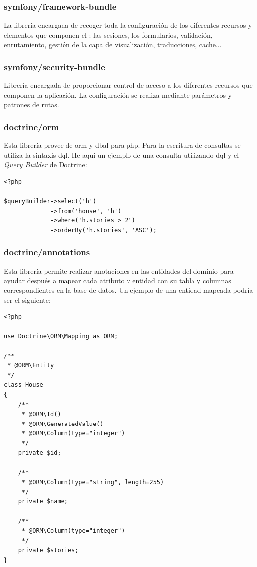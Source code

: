 \subsubsection{symfony/framework-bundle}
La librería encargada de recoger toda la configuración de los diferentes
recursos y elementos que componen el : las
sesiones, los formularios, validación, enrutamiento\cite{symfony_frambun},
gestión de la capa de visualización, traducciones, cache...

\subsubsection{symfony/security-bundle}
Librería encargada de proporcionar control de acceso a los diferentes recursos
que componen la aplicación. La configuración se realiza mediante parámetros y
patrones de rutas.

\subsubsection{doctrine/orm}
Esta librería provee de \gls{orm} y \gls{dbal} para \gls{php}. Para la
escritura de consultas se utiliza la sintaxis \gls{dql}. He aquí un ejemplo
de una consulta utilizando \gls{dql} y el \textit{Query Builder} de Doctrine:

\begin{verbatim}
<?php

$queryBuilder->select('h')
             ->from('house', 'h')
             ->where('h.stories > 2')
             ->orderBy('h.stories', 'ASC');

\end{verbatim}

\subsubsection{doctrine/annotations}
Esta librería permite realizar anotaciones en las entidades del dominio para
ayudar después a mapear cada atributo y entidad con su tabla y columnas
correspondientes en la base de datos. Un ejemplo de una entidad mapeada podría
ser el siguiente:

\begin{verbatim}
<?php

use Doctrine\ORM\Mapping as ORM;

/**
 * @ORM\Entity
 */
class House
{
    /**
     * @ORM\Id()
     * @ORM\GeneratedValue()
     * @ORM\Column(type="integer")
     */
    private $id;

    /**
     * @ORM\Column(type="string", length=255)
     */
    private $name;

    /**
     * @ORM\Column(type="integer")
     */
    private $stories;
}
\end{verbatim}

